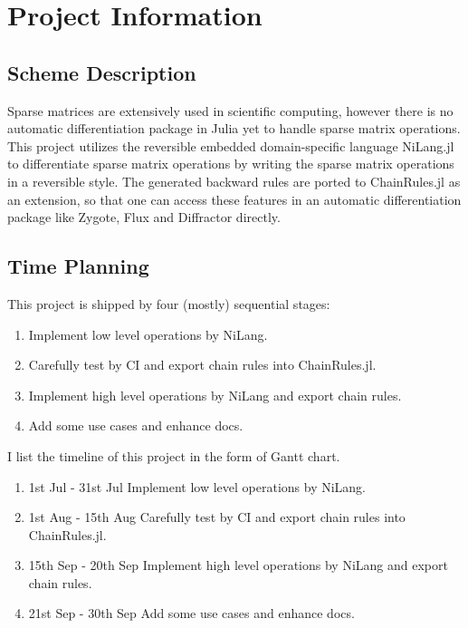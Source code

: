 

\section{Project Information}
\subsection{Scheme Description}
Sparse matrices are extensively used in scientific computing, however there is no automatic differentiation package in Julia yet to handle sparse matrix operations. This project utilizes the reversible embedded domain-specific language NiLang.jl to differentiate sparse matrix operations by writing the sparse matrix operations in a reversible style. The generated backward rules are ported to ChainRules.jl as an extension, so that one can access these features in an automatic differentiation package like Zygote, Flux and Diffractor directly.
\subsection{Time Planning}

This project is shipped by four (mostly) sequential stages:
\begin{enumerate}[(1)]
    \item Implement low level operations by NiLang.
    \item Carefully test by CI and export chain rules into ChainRules.jl. 
    \item Implement high level operations by NiLang and export chain rules.
    \item Add some use cases and enhance docs. 
\end{enumerate}

I list the timeline of this project in the form of Gantt chart.
\begin{enumerate}[(1)]
    \item 1st Jul - 31st Jul \quad Implement low level operations by NiLang. 
    \item 1st Aug - 15th Aug   \quad Carefully test by CI and export chain rules into ChainRules.jl.
    \item 15th Sep - 20th Sep \quad  Implement high level operations by NiLang and export chain rules. 
    \item 21st Sep - 30th Sep \quad Add some use cases and enhance docs.
\end{enumerate}
\vspace{0.5cm}


